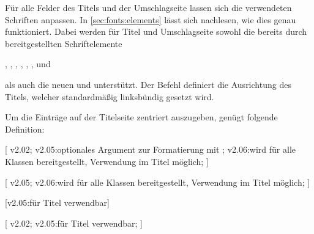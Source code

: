 \begin{DeclareEntity*}{}
\begin{DeclareEntity*}{}
\begin{DeclareEntity*}{}
\begin{Declaration}
\begin{Declaration}
\begin{Declaration}
%
Für alle Felder des Titels und der Umschlagseite lassen sich die verwendeten
Schriften anpassen. In \autoref{sec:fonts:elements} lässt sich nachlesen, wie 
dies genau funktioniert. Dabei werden für Titel und Umschlagseite sowohl die 
bereits durch \KOMAScript bereitgestellten Schriftelemente
\begin{Entity}{}
, , , , 
, ,  und 
\end{Entity}
als auch die neuen  und  unterstützt.
%
Der Befehl  definiert die Ausrichtung des Titels, welcher 
standardmäßig linksbündig gesetzt wird.
\begin{Example}
Um die Einträge auf der Titelseite zentriert auszugeben, genügt folgende 
Definition:
\begin{Code}
\let\raggedtitle\centering
\end{Code}
\end{Example}
\end{Declaration}
\end{Declaration}
\end{Declaration}

\begin{Declaration}
  {}
\begin{Declaration}
  {}
\begin{Declaration}
  {}
  [
    v2.02;
    v2.05:optionales Argument zur Formatierung mit ;
    v2.06:wird für alle Klassen bereitgestellt, Verwendung im Titel möglich;
  ]
\begin{Declaration}
  {}
  [
    v2.05;
    v2.06:wird für alle Klassen bereitgestellt, Verwendung im Titel möglich;
  ]
\begin{Declaration}
  {}
\begin{Declaration}
  {}
\begin{Declaration}
  {}
\begin{Declaration}
  {}
\begin{Declaration}
  {}
  [v2.05:für Titel verwendbar]
\begin{Declaration}
  {}
  [
    v2.02;
    v2.05:für Titel verwendbar;
  ]


\end{Declaration}
\end{Declaration}
\end{Declaration}
\end{Declaration}
\end{Declaration}
\end{Declaration}
\end{Declaration}
\end{Declaration}
\end{Declaration}
\end{Declaration}
\end{DeclareEntity*}
\end{DeclareEntity*}
\end{DeclareEntity*}
